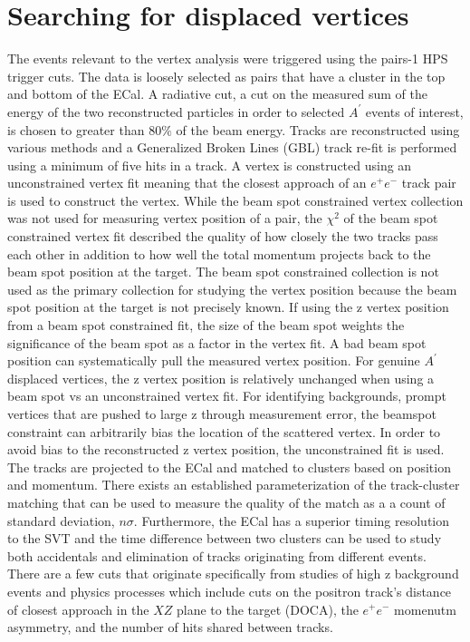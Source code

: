 \documentclass[12pt]{report}
\begin{document}
\chapter{Searching for displaced vertices}
The events relevant to the vertex analysis were triggered using the pairs-1 HPS trigger cuts. The data is loosely selected as pairs that have a cluster in the top and bottom of the ECal. A radiative cut, a cut on the measured sum of the energy of the two reconstructed particles in order to selected $A^{\prime}$ events of interest, is chosen to greater than 80$\%$ of the beam energy. Tracks are reconstructed using various methods and a Generalized Broken Lines (GBL) track re-fit is performed using a minimum of five hits in a track. A vertex is constructed using an unconstrained vertex fit meaning that the closest approach of an $e^+e^-$ track pair is used to construct the vertex. While the beam spot constrained vertex collection was not used for measuring vertex position of a pair, the $\chi^{2}$ of the beam spot constrained vertex fit described the quality of how closely the two tracks pass each other in addition to how well the total momentum projects back to the beam spot position at the target. 
\indent The beam spot constrained collection is not used as the primary collection for studying the vertex position because the beam spot position at the target is not precisely known. If using the z vertex position from a beam spot constrained fit, the size of the beam spot weights the significance of the beam spot as a factor in the vertex fit. A bad beam spot position can systematically pull the measured vertex position. For genuine $A^{\prime}$ displaced vertices, the z vertex position  is relatively unchanged when using a beam spot vs an unconstrained vertex fit. For identifying backgrounds, prompt vertices that are pushed to large z through measurement error, the beamspot constraint can arbitrarily bias the location of the scattered vertex. In order to avoid bias to the reconstructed z vertex position, the unconstrained fit is used.  \\
\indent The tracks are projected to the ECal and matched to clusters based on position and momentum. There exists an established parameterization of the track-cluster matching that can be used to measure the quality of the match as a a count of standard deviation, $n\sigma$. Furthermore, the ECal has a superior timing resolution to the SVT and the time difference between two clusters can be used to study both accidentals and elimination of tracks originating from different events. \\
\indent There are a few cuts that originate specifically from studies of high z background events and physics processes which include cuts on the positron track's distance of closest approach in the $XZ$ plane to the target (DOCA), the $e^+e^-$ momenutm asymmetry, and the number of hits shared between tracks. 
\end{document}
